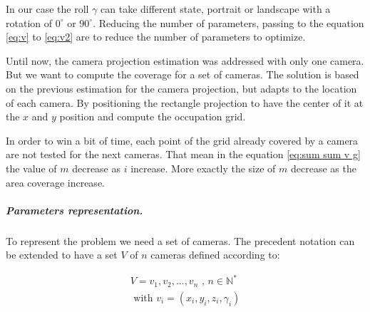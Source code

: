 In our case the roll $\gamma$ can take different state, portrait or landscape with a rotation of $0^\circ$ or $90^\circ$.
Reducing the number of  parameters, passing to the equation \ref{eq:v} to \ref{eq:v2} are to reduce the number of parameters to optimize. 


Until now, the camera projection estimation was addressed with only one camera. But we want to compute the coverage for a set of cameras. 
The solution is based on the previous estimation for the camera projection, but adapts to the location of each camera. By positioning the rectangle projection to have the center of it at the $x$ and $y$ position and compute the occupation grid.

In order to win a bit of time, each point of the grid already covered by a camera are not tested for the next cameras. %
That mean in the equation \ref{eq:sum sum v g} the value of $m$ decrease as $i$ increase. More exactly the size of $m$ decrease as the area coverage increase.  


\subparagraph{Parameters representation. \\}

To represent the problem we need a set of cameras. The precedent notation can be extended to have a set $V$ of $n$ cameras defined according to:

\begin{equation}\label{eq:V}
		\begin{split}
			V= {v_1,v_2,...,v_n} \mbox{  , } n\in \mathbb{N}^*
				\\
			\mbox{ with } v_i= (x_i,y_i,z_i,\gamma_i)
		\end{split}
	\end{equation}
	
